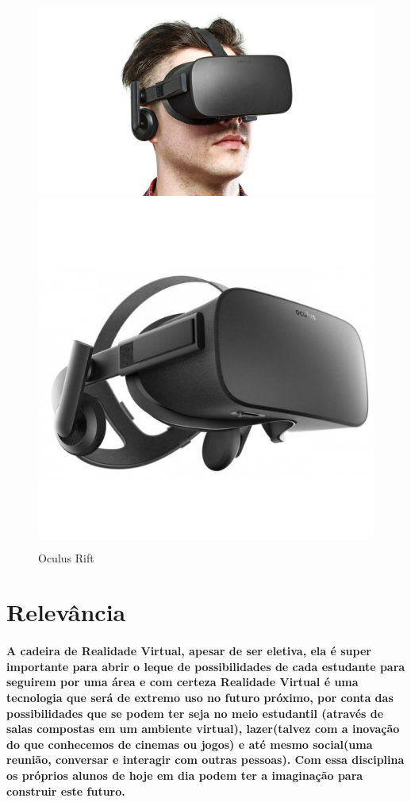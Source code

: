 \documentclass{paper}
\begin{document}
\begin{figure}[h!]
\centering
\includegraphics[scale=0.4]{Oculus.jpg}
\includegraphics[scale=0.08]{Oculus2.jpg}
\caption{Oculus Rift\citep{Oculus}}

\end{figure}



\section{Relevância}
\paragraph{        A cadeira de Realidade Virtual, apesar de ser eletiva, ela é super importante para abrir o leque de possibilidades de cada estudante para seguirem por uma área e com certeza Realidade Virtual é uma tecnologia que será de extremo uso no futuro próximo, por conta das possibilidades que se podem ter seja no meio estudantil\cite{Fonte2} (através de salas compostas em um ambiente virtual), lazer(talvez com a inovação do que conhecemos de cinemas ou jogos) e até mesmo social\cite{Fonte}(uma reunião, conversar e interagir com outras pessoas). Com essa disciplina os próprios alunos de hoje em dia podem ter a imaginação para construir este futuro. }
\end{document}
